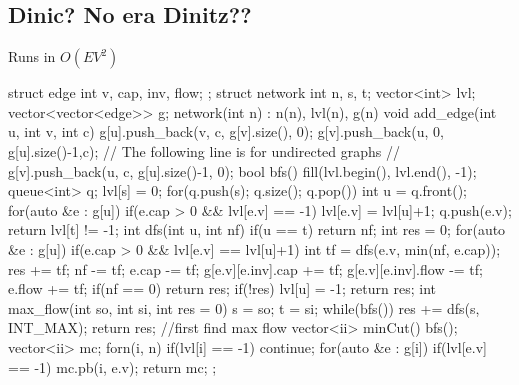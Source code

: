 \documentclass[10pt, landscape, twocolumn, a4paper, notitlepage]{article}
\begin{document}
\subsection{Dinic? No era Dinitz??}
Runs in $O(EV^2)$
\begin{code}
struct edge { int v, cap, inv, flow; };
struct network {
  int n, s, t;
  vector<int> lvl;
  vector<vector<edge>> g;
  network(int n) : n(n), lvl(n), g(n) {}
  void add_edge(int u, int v, int c) {
    g[u].push_back({v, c, g[v].size(), 0});
    g[v].push_back({u, 0, g[u].size()-1,c});
    // The following line is for undirected graphs
    // g[v].push_back({u, c, g[u].size()-1, 0});
  }
  bool bfs() {
    fill(lvl.begin(), lvl.end(), -1);
    queue<int> q;
    lvl[s] = 0;
    for(q.push(s); q.size(); q.pop()) {
      int u = q.front();
      for(auto &e : g[u]) {
        if(e.cap > 0 && lvl[e.v] == -1) {
          lvl[e.v] = lvl[u]+1;
          q.push(e.v);
        }
      }
    }
    return lvl[t] != -1;
  }
  int dfs(int u, int nf) {
    if(u == t) return nf;
    int res = 0;
    for(auto &e : g[u]) {
      if(e.cap > 0 && lvl[e.v] == lvl[u]+1) {
        int tf = dfs(e.v, min(nf, e.cap));
        res += tf; nf -= tf; e.cap -= tf;
        g[e.v][e.inv].cap += tf;
        g[e.v][e.inv].flow -= tf;
        e.flow += tf;
        if(nf == 0) return res;
      }
    }
    if(!res) lvl[u] = -1;
    return res;
  }
  int max_flow(int so, int si, int res = 0) {
    s = so; t = si;
    while(bfs()) res += dfs(s, INT_MAX);
    return res;
  }
  //first find max flow
  vector<ii> minCut() {
    bfs();
    vector<ii> mc;
    forn(i, n) {
        if(lvl[i] == -1) continue;
        for(auto &e : g[i]) {
            if(lvl[e.v] == -1) {
                mc.pb({i, e.v});
            }
        }
    }
    return mc;
  }
};
\end{code}
\end{document}
